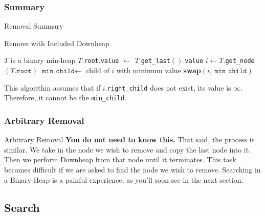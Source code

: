 \documentclass[10pt,compress]{beamer}
\begin{document}
\subsubsection{Summary}

\begin{frame}{Removal Summary}
  \begin{algorithm}[H]
    \caption{Remove with Included Downheap}\label{alg:heap_remove}
    \begin{algorithmic}
      \Require $T$ is a binary min-heap
      \State $T$.\texttt{root}.\texttt{value} $\gets$ $T$.\texttt{get\_last}$()$.\texttt{value}  
      \State $i \gets T$.\texttt{get\_node}$(T\text{.}\texttt{root})$  
      \State $\texttt{min\_child}\gets$ child of $i$ with minimum value
      \State \textbf{swap}$(i,\ \texttt{min\_child})$ 
      \EndWhile
    \end{algorithmic}
  \end{algorithm}
  This algorithm assumes that if $i$.\texttt{right\_child} does not exist, its value is $\infty$. Therefore, it cannot be the \texttt{min\_child}.
\end{frame}

\subsubsection{Arbitrary Removal}
\begin{frame}{Arbitrary Removal}
  \textbf{You do not need to know this.} That said, the process is similar. We take in the node we wish to remove and copy the last node into it. Then we perform Downheap from that node until it terminates. This task becomes difficult if we are asked to find the node we wish to remove. Searching in a Binary Heap is a painful experience, as you'll soon see in the next section.
\end{frame}

\subsection{Search}
\end{document}
